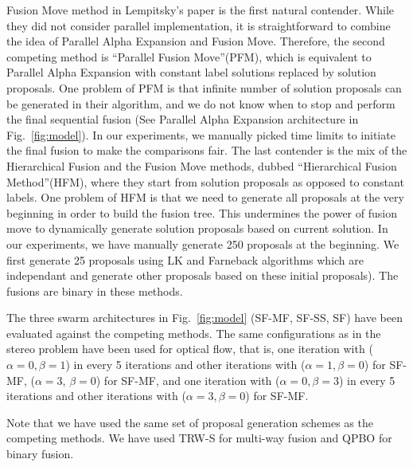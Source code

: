 \noindent Fusion Move method in Lempitsky's paper is the first natural
contender. While they did not consider parallel implementation, it is
straightforward to combine the idea of Parallel Alpha Expansion and
Fusion Move. Therefore, the second competing method is ``Parallel Fusion
Move''(PFM), which is equivalent to Parallel Alpha Expansion with constant
label solutions replaced by solution proposals.
%
One problem of PFM is that infinite number of solution proposals can be
generated in their algorithm, and we do not know when to stop and
perform the final sequential fusion (See Parallel Alpha Expansion
architecture in Fig.~\ref{fig:model}). In our experiments, we manually
picked time limits to initiate the final fusion to make the comparisons
fair.
%
The last contender is the mix of the Hierarchical Fusion and the Fusion
Move methods, dubbed ``Hierarchical Fusion Method''(HFM), where they
start from solution proposals as opposed to constant labels. One problem
of HFM is that we need to generate all proposals at the very beginning in order to build the fusion tree. This undermines the power of fusion move to dynamically generate solution proposals based on current solution. In our experiments, we have manually generate 250 proposals at the beginning. We first generate 25 proposals using LK and Farneback algorithms which are independant and generate other proposals based on these initial proposals). The fusions are binary in these methods. %


\noindent
The three swarm architectures in Fig.~\ref{fig:model} (SF-MF, SF-SS, SF)
have been evaluated against the competing methods. The same
configurations as in the stereo problem have been used for optical flow,
that is, one iteration with ($\alpha=0, \beta=1$) in every 5 iterations and other iterations with ($\alpha=1, \beta=0$) for SF-MF, ($\alpha=3$, $\beta=0$) for SF-MF, and one iteration with ($\alpha=0, \beta=3$) in every 5 iterations and other iterations with ($\alpha=3, \beta=0$) for SF-MF.

%
Note that we have used the same set of proposal generation schemes as
the competing methods. We have used TRW-S for multi-way fusion and QPBO
for binary fusion.
%
%
